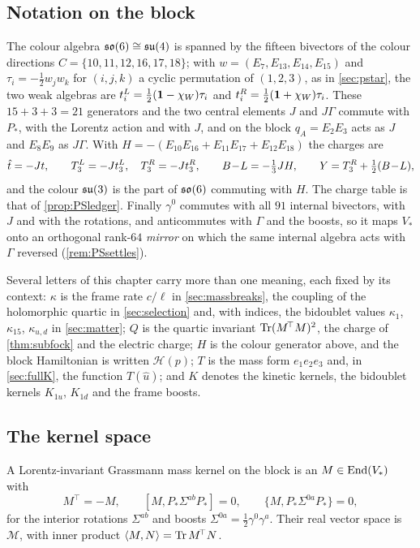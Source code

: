 \subsection{Notation on the block}

The colour algebra $\mathfrak{so}(6)\cong\mathfrak{su}(4)$ is spanned by the fifteen bivectors of the colour directions $C=\{10,11,12,16,17,18\}$; with
$w=(E_7,E_{13},E_{14},E_{15})$ and $\tau_i=-\tfrac12w_jw_k$ for $(i,j,k)$ a cyclic permutation of $(1,2,3)$, as in \cref{sec:pstar},
the two weak algebras are $t^L_i=\tfrac12(\mathbf 1-\chi_W)\tau_i$ and
$t^R_i=\tfrac12(\mathbf 1+\chi_W)\tau_i$. These $15+3+3=21$ generators and the two central elements $J$ and $J\Gamma$ commute with $P_*$, with the
Lorentz action and with $J$, and on the block $q_A=E_2E_3$ acts as $J$ and $E_8E_9$ as $J\Gamma$. With $H=-(E_{10}E_{16}+E_{11}E_{17}+E_{12}E_{18})$
the charges are
\[
\hat t=-Jt,\qquad T^L_3=-Jt^L_3,\quad T^R_3=-Jt^R_3,\qquad B\!-\!L=-\tfrac13JH,\qquad Y=T^R_3+\tfrac12(B\!-\!L),
\]
and the colour $\mathfrak{su}(3)$ is the part of $\mathfrak{so}(6)$ commuting with $H$. The charge table is that of \cref{prop:PSledger}. Finally $\gamma^0$
commutes with all $91$ internal bivectors, with $J$ and with the rotations, and anticommutes with $\Gamma$ and the boosts, so it maps $V_*$
onto an orthogonal rank-$64$ \emph{mirror} on which the same internal algebra acts with $\Gamma$ reversed (\cref{rem:PSsettles}).

Several letters of this chapter carry more than one meaning, each fixed by its context: $\kappa$ is the frame rate $c/\ell$ in
\cref{sec:massbreaks}, the coupling of the holomorphic quartic in \cref{sec:selection} and, with indices, the bidoublet values $\kappa_1$, $\kappa_{15}$,
$\kappa_{u,d}$ in \cref{sec:matter}; $Q$ is the quartic invariant $\operatorname{Tr}(M^{\!\top}M)^2$, the charge of \cref{thm:subfock} and the electric charge; $H$ is the
colour generator above, and the block Hamiltonian is written $\mathcal H(p)$; $T$ is the mass form $e_1e_2e_3$ and, in \cref{sec:fullK}, the function $T(\hat u)$;
and $K$ denotes the kinetic kernels, the bidoublet kernels $K_{1u}$, $K_{1d}$ and the frame boosts.

\subsection{The kernel space}

\begin{definition}
\label{def:kernel}
A Lorentz-invariant Grassmann mass kernel on the block is an $M\in\operatorname{End}(V_*)$ with
\[
M^{\!\top}=-M,\qquad [M,P_*\Sigma^{ab}P_*]=0,\qquad \{M,P_*\Sigma^{0a}P_*\}=0 ,
\]
for the interior rotations $\Sigma^{ab}$ and boosts $\Sigma^{0a}=\tfrac12\gamma^0\gamma^a$. Their real vector space is $\mathcal M$, with inner product
$\langle M,N\rangle=\operatorname{Tr} M^{\!\top}N$.
\end{definition}

